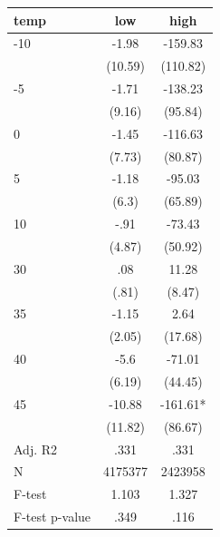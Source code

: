 \documentclass[]{article}
\begin{document}
\begin{tabular}{lcc} \hline
temp & low & high \\ \hline
-10 & -1.98 & -159.83 \\
 & (10.59) & (110.82) \\
-5 & -1.71 & -138.23 \\
 & (9.16) & (95.84) \\
0 & -1.45 & -116.63 \\
 & (7.73) & (80.87) \\
5 & -1.18 & -95.03 \\
 & (6.3) & (65.89) \\
10 & -.91 & -73.43 \\
 & (4.87) & (50.92) \\
30 & .08 & 11.28 \\
 & (.81) & (8.47) \\
35 & -1.15 & 2.64 \\
 & (2.05) & (17.68) \\
40 & -5.6 & -71.01 \\
 & (6.19) & (44.45) \\
45 & -10.88 & -161.61* \\
 & (11.82) & (86.67) \\
\hline Adj. R2 & .331 & .331 \\
N & 4175377 & 2423958 \\
F-test & 1.103 & 1.327 \\
 F-test p-value & .349 & .116 \\ \hline
\end{tabular}
\end{document}
